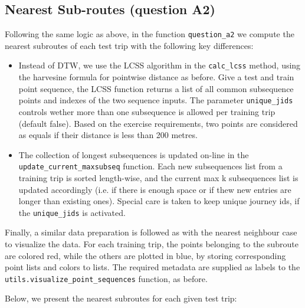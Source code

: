 \documentclass[12pt]{article}
\begin{document}
	\subsection{Nearest Sub-routes (question A2)}
	Following the same logic as above, in the function \texttt{question\_a2} we
  compute the nearest subroutes of each test trip with the following key
  differences:
  \begin{itemize}
    \item Instead of DTW, we use the LCSS algorithm in the \texttt{calc\_lcss}
      method, using the harvesine formula for pointwise distance as before. Give
      a test and train point sequence, the LCSS function returns a list of all
      common subsequence points and indexes of the two sequence inputs. The
      parameter \texttt{unique\_jids} controls wether more than one subsequence
      is allowed per training trip (default false). Based on the exercise
      requirements, two points are considered as equals if their distance is less than 200 metres.

      \item The collection of longest subsequences is updated on-line in the
        \\ \texttt{update\_current\_maxsubseq} function. Each new subsequences list
        from a training trip is sorted length-wise, and the current max k
        subsequences list is updated accordingly (i.e. if there is enough space
        or if thew new entries are longer than existing ones). Special care is
        taken to keep unique journey ids, if the \texttt{unique\_jids} is activated.
      \end{itemize}
	
	Finally, a similar data preparation is followed as with the nearest neighbour
  case to visualize the data. For each training trip, the points belonging to
  the subroute are colored red, while the others are plotted in blue, by storing
  corresponding point lists and colors to lists. The required metadata are
  supplied as labels to the \texttt{utils.visualize\_point\_sequences} function,
  as before.
	
  Below, we present the nearest subroutes for each given test trip:
	
\end{document}
